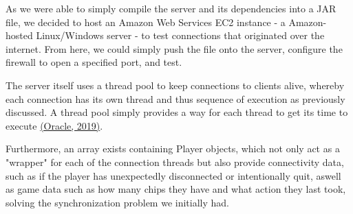 \documentclass[11pt]{article}
\begin{document}
As we were able to simply compile the server and its dependencies into a JAR file, we decided to host an Amazon Web Services EC2 instance - a Amazon-hosted Linux/Windows server - to test connections that originated over the internet. From here, we could simply push the file onto the server, configure the firewall to open a specified port, and test. 

The server itself uses a thread pool to keep connections to clients alive, whereby each connection has its own thread and thus sequence of execution as previously discussed. A thread pool simply provides a way for each thread to get its time to execute  \hyperlink{threadpool}{(Oracle, 2019)}. 

Furthermore, an array exists containing Player objects, which not only act as a "wrapper" for each of the connection threads but also provide connectivity data, such as if the player has unexpectedly disconnected or intentionally quit, aswell as game data such as how many chips they have and what action they last took, solving the synchronization problem we initially had. 
\end{document}
